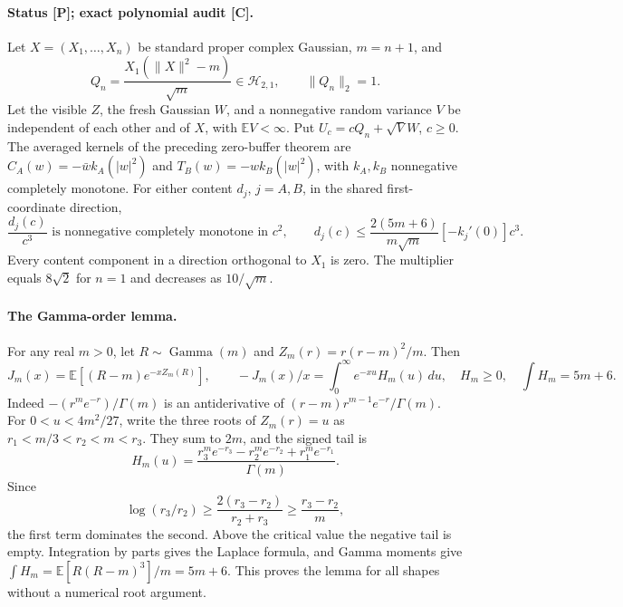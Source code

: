 \paragraph{Status [P]; exact polynomial audit [C].}
Let $X=(X_1,\ldots,X_n)$ be standard proper complex Gaussian,
$m=n+1$, and
\[
 Q_n=\frac{X_1(\|X\|^2-m)}{\sqrt m}\in\mathcal H_{2,1},
 \qquad \|Q_n\|_2=1.
\]
Let the visible $Z$, the fresh Gaussian $W$, and a nonnegative random
variance $V$ be independent of each other and of $X$, with
$\mathbb EV<\infty$. Put $U_c=cQ_n+\sqrt VW$, $c\ge0$.
The averaged kernels of the preceding zero-buffer theorem are
$C_A(w)=-\bar w k_A(|w|^2)$ and $T_B(w)=-w k_B(|w|^2)$,
with $k_A,k_B$ nonnegative completely monotone.
For either content $d_j$, $j=A,B$, in the shared first-coordinate
direction,
\begin{equation}
 \boxed{\frac{d_j(c)}{c^3}\text{ is nonnegative completely monotone
 in }c^2,\qquad
 d_j(c)\le
 \frac{2(5m+6)}{m\sqrt m}[-k_j'(0)]c^3.}
 \label{eq:radial-content-cm}
\end{equation}
Every content component in a direction orthogonal to $X_1$ is zero.
The multiplier equals $8\sqrt2$ for $n=1$ and decreases as
$10/\sqrt m$.

\paragraph{The Gamma-order lemma.}
For any real $m>0$, let $R\sim\operatorname{Gamma}(m)$ and
$Z_m(r)=r(r-m)^2/m$. Then
\[
 J_m(x)=\mathbb E[(R-m)e^{-xZ_m(R)}],\qquad
 -J_m(x)/x=\int_0^\infty e^{-xu}H_m(u)\,du,
 \quad H_m\ge0,\quad \int H_m=5m+6.
\]
Indeed $-(r^me^{-r})/\Gamma(m)$ is an antiderivative of
$(r-m)r^{m-1}e^{-r}/\Gamma(m)$.
For $0<u<4m^2/27$, write the three roots of $Z_m(r)=u$ as
$r_1<m/3<r_2<m<r_3$. They sum to $2m$, and the signed tail is
\[
 H_m(u)=
 \frac{r_3^me^{-r_3}-r_2^me^{-r_2}+r_1^me^{-r_1}}{\Gamma(m)}.
\]
Since
\[
 \log(r_3/r_2)\ge\frac{2(r_3-r_2)}{r_2+r_3}
 \ge\frac{r_3-r_2}{m},
\]
the first term dominates the second. Above the critical value the
negative tail is empty. Integration by parts gives the Laplace formula,
and Gamma moments give
$\int H_m=\mathbb E[R(R-m)^3]/m=5m+6$.
This proves the lemma for all shapes without a numerical root argument.


